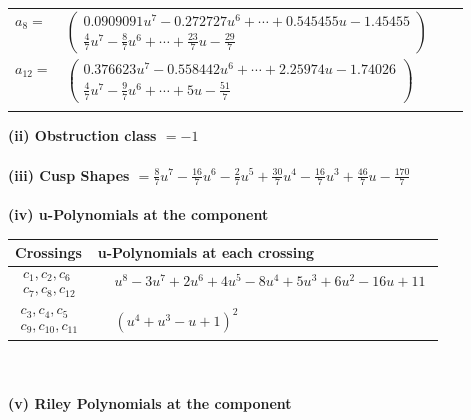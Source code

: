 \documentclass[1p]{elsarticle_modified}
\theoremstyle{definition}
\begin{document}
\begin{tabular}{m{7pt} m{180pt} m{7pt} m{180pt} }
\flushright $a_{8}=$&$\begin{pmatrix}0.0909091 u^{7}-0.272727 u^{6}+\cdots+0.545455 u-1.45455\\\frac{4}{7} u^7-\frac{8}{7} u^6+\cdots+\frac{23}{7} u-\frac{29}{7}\end{pmatrix}$ \\
\flushright $a_{12}=$&$\begin{pmatrix}0.376623 u^{7}-0.558442 u^{6}+\cdots+2.25974 u-1.74026\\\frac{4}{7} u^7-\frac{9}{7} u^6+\cdots+5 u-\frac{51}{7}\end{pmatrix}$\\&\end{tabular}
\flushleft \textbf{(ii) Obstruction class $= -1$}\\~\\
\flushleft \textbf{(iii) Cusp Shapes $= \frac{8}{7} u^7-\frac{16}{7} u^6-\frac{2}{7} u^5+\frac{30}{7} u^4-\frac{16}{7} u^3+\frac{46}{7} u-\frac{170}{7}$}\\~\\
\newpage\renewcommand{\arraystretch}{1}
\flushleft \textbf{(iv) u-Polynomials at the component}\newline \\
\begin{tabular}{m{50pt}|m{274pt}}
Crossings & \hspace{64pt}u-Polynomials at each crossing \\
\hline $$\begin{aligned}c_{1},c_{2},c_{6}\\c_{7},c_{8},c_{12}\end{aligned}$$&$\begin{aligned}
&u^8-3 u^7+2 u^6+4 u^5-8 u^4+5 u^3+6 u^2-16 u+11
\end{aligned}$\\
\hline $$\begin{aligned}c_{3},c_{4},c_{5}\\c_{9},c_{10},c_{11}\end{aligned}$$&$\begin{aligned}
&(u^4+u^3- u+1)^2
\end{aligned}$\\
\hline
\end{tabular}\\~\\
\newpage\renewcommand{\arraystretch}{1}
\flushleft \textbf{(v) Riley Polynomials at the component}\newline \\
\end{document}

